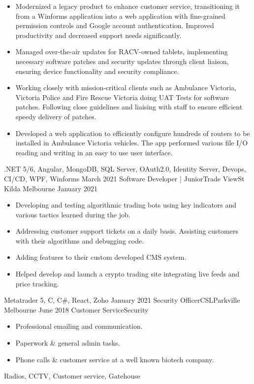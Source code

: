 \begin{experiences}
{\begin{itemize}
                        \item Modernized a legacy product to enhance customer service, transitioning it from a Winforms application into a web application with fine-grained permission controls and Google account authentication. Improved productivity and decreased support needs significantly.
                        \item Managed over-the-air updates for RACV-owned tablets, implementing necessary software patches and security updates through client liaison, ensuring device functionality and security compliance.
                        \item Working closely with mission-critical clients such as Ambulance Victoria, Victoria Police and Fire Rescue Victoria doing UAT Tests for software patches. Following close guidelines and liaising with staff to ensure efficient speedy delivery of patches.
                        \item Developed a web application to efficiently configure hundreds of routers to be installed in Ambulance Victoria vehicles. The app performed various file I/O reading and writing in an easy to use user interface.
                      \end{itemize}
                    }
                    {.NET 5/6, Angular, MongoDB, SQL Server, OAuth2.0, Identity Server, Devops, CI/CD, WPF, Winforms}
  \emptySeparator
  \experience
    {March 2021}     {Software Developer | Junior}{Trade View}{St Kilda Melbourne}
    {January 2021}    {
                      \begin{itemize}
                        \item Developing and testing algorithmic trading bots using key indicators and various tactics learned during the job.
                        \item Addressing customer support tickets on a daily basis. Assisting customers with their algorithms and debugging code.
                        \item Adding features to their custom developed CMS system.
                        \item Helped develop and launch a crypto trading site integrating live feeds and price tracking. 
                      \end{itemize}
                    }
                    {Metatrader 5, C, C\#, React, Zoho}
  \emptySeparator
  \consultantexperience
  {January 2021}       {Security Officer}{CSL}{Parkville Melbourne}
  {June 2018}      {Customer Service}{Security}
                    {
                      \begin{itemize}
                        \item Professional emailing and communication.
                        \item Paperwork \& general admin tasks.
                        \item Phone calls \& customer service at a well known biotech company.
                      \end{itemize}
                    }
                    {Radios, CCTV, Customer service, Gatehouse}
  \emptySeparator
\end{experiences}
